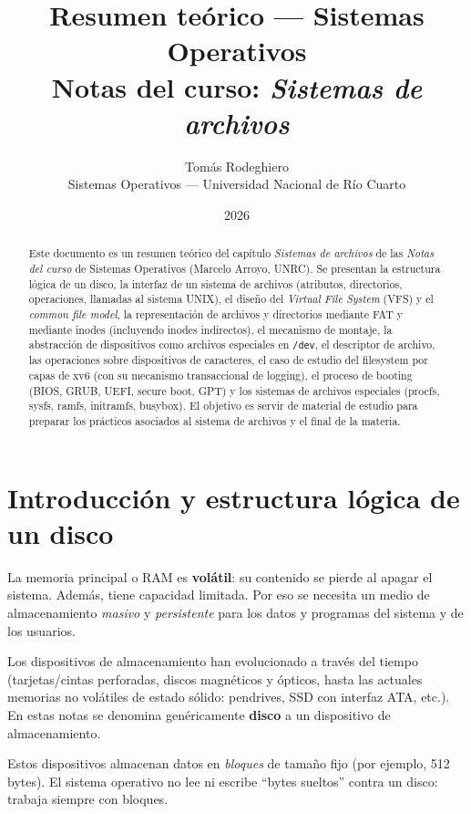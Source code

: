 \documentclass[11pt,a4paper]{article}
\title{
    \vspace{-2.5em}
    \textbf{Resumen teórico --- Sistemas Operativos} \\[0.3em]
    \large Notas del curso: \emph{Sistemas de archivos}
}
\author{
    Tomás Rodeghiero \\
    \small Sistemas Operativos --- Universidad Nacional de Río Cuarto
}
\date{2026}
\begin{document}
\maketitle

\begin{abstract}
\noindent
Este documento es un resumen teórico del capítulo \emph{Sistemas de
archivos} de las \emph{Notas del curso} de Sistemas Operativos (Marcelo
Arroyo, UNRC). Se presentan la estructura lógica de un disco, la
interfaz de un sistema de archivos (atributos, directorios,
operaciones, llamadas al sistema UNIX), el diseño del \emph{Virtual
File System} (VFS) y el \emph{common file model}, la representación
de archivos y directorios mediante FAT y mediante inodes (incluyendo
inodes indirectos), el mecanismo de montaje, la abstracción de
dispositivos como archivos especiales en \texttt{/dev}, el descriptor
de archivo, las operaciones sobre dispositivos de caracteres, el caso
de estudio del filesystem por capas de xv6 (con su mecanismo
transaccional de logging), el proceso de booting (BIOS, GRUB, UEFI,
secure boot, GPT) y los sistemas de archivos especiales (procfs,
sysfs, ramfs, initramfs, busybox). El objetivo es servir de material
de estudio para preparar los prácticos asociados al sistema de
archivos y el final de la materia.
\end{abstract}

\tableofcontents
\bigskip

\section{Introducción y estructura lógica de un disco}

La memoria principal o RAM es \textbf{volátil}: su contenido se pierde
al apagar el sistema. Además, tiene capacidad limitada. Por eso se
necesita un medio de almacenamiento \emph{masivo} y \emph{persistente}
para los datos y programas del sistema y de los usuarios.

Los dispositivos de almacenamiento han evolucionado a través del tiempo
(tarjetas/cintas perforadas, discos magnéticos y ópticos, hasta las
actuales memorias no volátiles de estado sólido: pendrives, SSD con
interfaz ATA, etc.). En estas notas se denomina genéricamente
\textbf{disco} a un dispositivo de almacenamiento.

\begin{idea}
Estos dispositivos almacenan datos en \emph{bloques} de tamaño fijo
(por ejemplo, 512\,bytes). El sistema operativo no lee ni escribe
``bytes sueltos'' contra un disco: trabaja siempre con bloques.
\end{idea}
\end{document}

